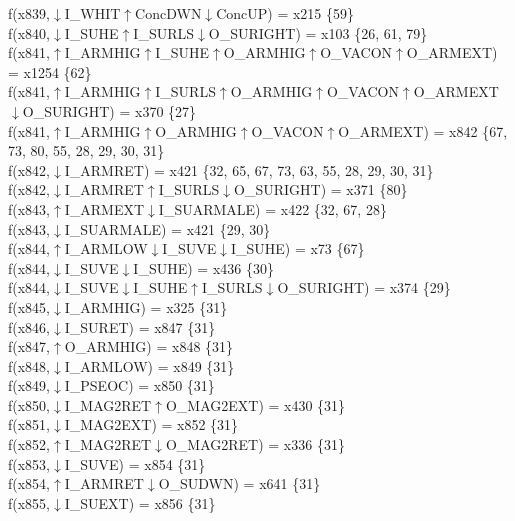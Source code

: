 f(x839,$\downarrow$I\_WHIT$\uparrow$ConcDWN$\downarrow$ConcUP) = x215 \{59\} \\  
f(x840,$\downarrow$I\_SUHE$\uparrow$I\_SURLS$\downarrow$O\_SURIGHT) = x103 \{26, 61, 79\} \\  
f(x841,$\uparrow$I\_ARMHIG$\uparrow$I\_SUHE$\uparrow$O\_ARMHIG$\uparrow$O\_VACON$\uparrow$O\_ARMEXT) = x1254 \{62\} \\  
f(x841,$\uparrow$I\_ARMHIG$\uparrow$I\_SURLS$\uparrow$O\_ARMHIG$\uparrow$O\_VACON$\uparrow$O\_ARMEXT$\downarrow$O\_SURIGHT) = x370 \{27\} \\  
f(x841,$\uparrow$I\_ARMHIG$\uparrow$O\_ARMHIG$\uparrow$O\_VACON$\uparrow$O\_ARMEXT) = x842 \{67, 73, 80, 55, 28, 29, 30, 31\} \\  
f(x842,$\downarrow$I\_ARMRET) = x421 \{32, 65, 67, 73, 63, 55, 28, 29, 30, 31\} \\  
f(x842,$\downarrow$I\_ARMRET$\uparrow$I\_SURLS$\downarrow$O\_SURIGHT) = x371 \{80\} \\  
f(x843,$\uparrow$I\_ARMEXT$\downarrow$I\_SUARMALE) = x422 \{32, 67, 28\} \\  
f(x843,$\downarrow$I\_SUARMALE) = x421 \{29, 30\} \\  
f(x844,$\uparrow$I\_ARMLOW$\downarrow$I\_SUVE$\downarrow$I\_SUHE) = x73 \{67\} \\  
f(x844,$\downarrow$I\_SUVE$\downarrow$I\_SUHE) = x436 \{30\} \\  
f(x844,$\downarrow$I\_SUVE$\downarrow$I\_SUHE$\uparrow$I\_SURLS$\downarrow$O\_SURIGHT) = x374 \{29\} \\  
f(x845,$\downarrow$I\_ARMHIG) = x325 \{31\} \\  
f(x846,$\downarrow$I\_SURET) = x847 \{31\} \\  
f(x847,$\uparrow$O\_ARMHIG) = x848 \{31\} \\  
f(x848,$\downarrow$I\_ARMLOW) = x849 \{31\} \\  
f(x849,$\downarrow$I\_PSEOC) = x850 \{31\} \\  
f(x850,$\downarrow$I\_MAG2RET$\uparrow$O\_MAG2EXT) = x430 \{31\} \\  
f(x851,$\downarrow$I\_MAG2EXT) = x852 \{31\} \\  
f(x852,$\uparrow$I\_MAG2RET$\downarrow$O\_MAG2RET) = x336 \{31\} \\  
f(x853,$\downarrow$I\_SUVE) = x854 \{31\} \\  
f(x854,$\uparrow$I\_ARMRET$\downarrow$O\_SUDWN) = x641 \{31\} \\  
f(x855,$\downarrow$I\_SUEXT) = x856 \{31\} \\  

